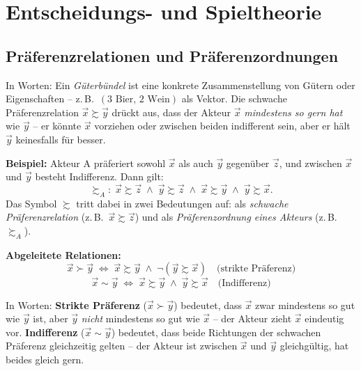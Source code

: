 \section{Entscheidungs- und Spieltheorie}

\subsection{Präferenzrelationen und Präferenzordnungen}


In Worten: Ein \emph{Güterbündel} ist eine konkrete Zusammenstellung von Gütern oder Eigenschaften -- z.\,B.\ $(3\text{ Bier},\, 2\text{ Wein})$ als Vektor. Die schwache Präferenzrelation $\vec{x} \succsim \vec{y}$ drückt aus, dass der Akteur $\vec{x}$ \emph{mindestens so gern hat} wie $\vec{y}$ -- er könnte $\vec{x}$ vorziehen oder zwischen beiden indifferent sein, aber er hält $\vec{y}$ keinesfalls für besser.

\textbf{Beispiel:} Akteur A präferiert sowohl $\vec{x}$ als auch $\vec{y}$ gegenüber $\vec{z}$, und zwischen $\vec{x}$ und $\vec{y}$ besteht Indifferenz. Dann gilt:
\[
\succsim_A:\; \vec{x}\succsim\vec{z}\;\wedge\;\vec{y}\succsim\vec{z}\;\wedge\;\vec{x}\succsim\vec{y}\;\wedge\;\vec{y}\succsim\vec{x}.
\]
Das Symbol $\succsim$ tritt dabei in zwei Bedeutungen auf: als \emph{schwache Präferenzrelation} (z.\,B.\ $\vec{x}\succsim\vec{z}$) und als \emph{Präferenzordnung eines Akteurs} (z.\,B.\ $\succsim_A$).

\textbf{Abgeleitete Relationen:}
\[
\vec{x} \succ \vec{y} \;\Leftrightarrow\; \vec{x} \succsim \vec{y} \;\wedge\; \neg(\vec{y} \succsim \vec{x}) \quad \text{(strikte Präferenz)}
\]
\[
\vec{x} \sim \vec{y} \;\Leftrightarrow\; \vec{x} \succsim \vec{y} \;\wedge\; \vec{y} \succsim \vec{x} \quad \text{(Indifferenz)}
\]

In Worten: \textbf{Strikte Präferenz} ($\vec{x} \succ \vec{y}$) bedeutet, dass $\vec{x}$ zwar mindestens so gut wie $\vec{y}$ ist, aber $\vec{y}$ \emph{nicht} mindestens so gut wie $\vec{x}$ -- der Akteur zieht $\vec{x}$ eindeutig vor. \textbf{Indifferenz} ($\vec{x} \sim \vec{y}$) bedeutet, dass beide Richtungen der schwachen Präferenz gleichzeitig gelten -- der Akteur ist zwischen $\vec{x}$ und $\vec{y}$ gleichgültig, hat beides gleich gern.

